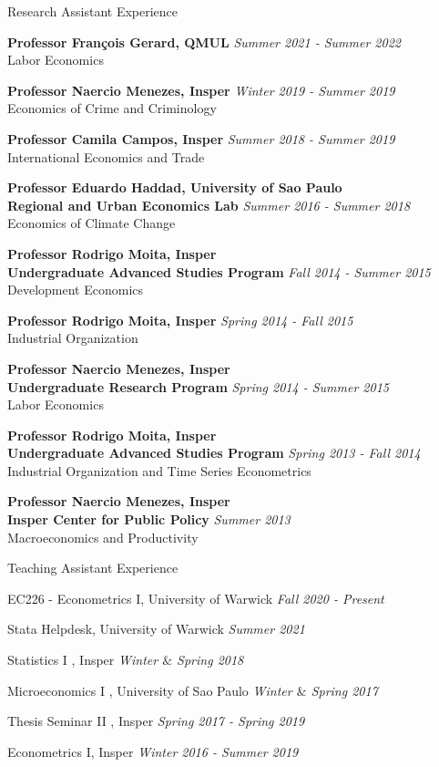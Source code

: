 \documentclass{resume} %
\begin{document}
\begin{rSection}{Research Assistant Experience}

{\bf Professor François Gerard, QMUL}   \hfill {\em Summer 2021 - Summer 2022} 
\\ Labor Economics

{\bf Professor Naercio Menezes, Insper} \hfill {\em Winter 2019 - Summer 2019} 
\\Economics of Crime and Criminology

{\bf Professor Camila Campos, Insper} \hfill {\em Summer 2018 - Summer 2019} 
\\International Economics and Trade

{\bf Professor Eduardo Haddad, University of Sao Paulo \\
Regional and Urban Economics Lab} \hfill {\em Summer 2016 - Summer 2018} 
\\Economics of Climate Change

{\bf Professor Rodrigo Moita, Insper \\ Undergraduate Advanced Studies Program}  \hfill {\em Fall 2014 - Summer 2015} 
\\Development Economics

{\bf Professor Rodrigo Moita, Insper} \hfill {\em Spring 2014 - Fall 2015} 
\\Industrial Organization

{\bf Professor Naercio Menezes, Insper \\ Undergraduate Research Program} \hfill {\em Spring 2014 - Summer 2015} 
\\Labor Economics

{\bf Professor Rodrigo Moita, Insper \\  Undergraduate Advanced Studies Program}  \hfill {\em Spring 2013 - Fall 2014} 
\\Industrial Organization and Time Series Econometrics

{\bf Professor Naercio Menezes, Insper \\ Insper Center for Public Policy}  \hfill {\em Summer 2013} 
\\ Macroeconomics and Productivity

\end{rSection}


\begin{rSection}{Teaching Assistant Experience}

{EC226 - Econometrics I, University of Warwick} \hfill {\em Fall 2020 - Present} 

{Stata Helpdesk, University of Warwick} \hfill {\em Summer 2021} 

{Statistics I , Insper} \hfill {\em Winter $\&$ Spring 2018} 

{ Microeconomics I , University of Sao Paulo} \hfill {\em Winter $\&$ Spring 2017} 

{Thesis Seminar II  , Insper} \hfill {\em Spring 2017 - Spring 2019} 

{ Econometrics I, Insper} \hfill {\em Winter 2016 - Summer 2019} 


\end{rSection}
\end{document}
